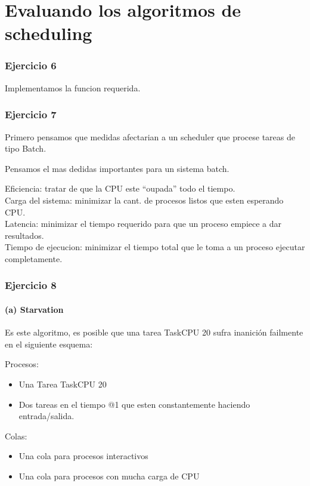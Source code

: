 \part{Evaluando los algoritmos de scheduling}

\section{Ejercicio 6}

Implementamos la funcion requerida.

\section{Ejercicio 7}

Primero pensamos que medidas afectarian a un scheduler que procese tareas de tipo Batch.

Pensamos el mas dedidas importantes para un sistema batch.

Eficiencia: tratar de que la CPU este ``oupada'' todo el tiempo.\\
Carga del sistema: minimizar la cant. de procesos listos que esten esperando CPU.\\
Latencia: minimizar el tiempo requerido para que un proceso empiece a dar resultados.\\
Tiempo de ejecucion: minimizar el tiempo total que le toma a un proceso ejecutar completamente.

\section{Ejercicio 8}

\subsection{(a) Starvation}

Es este algoritmo, es posible que una tarea TaskCPU 20 sufra inanici\'on failmente en el siguiente esquema:

Procesos:
\begin{itemize}
 \item Una Tarea TaskCPU 20
 \item Dos tareas en el tiempo @1 que esten constantemente haciendo entrada/salida.
\end{itemize}

Colas:
\begin{itemize}
 \item Una cola para procesos interactivos
 \item Una cola para procesos con mucha carga de CPU
\end{itemize}

